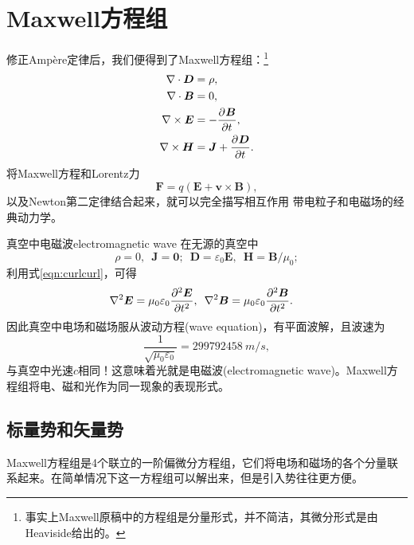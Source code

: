 \section{Maxwell方程组}
修正Ampère定律后，我们便得到了Maxwell方程组：\footnote{事实上Maxwell原稿中的方程组是分量形式，并不简洁，其微分形式是由Heaviside给出的。}
\begin{subequations}
    \begin{align}
        \label{eqn:Maxwell divD}
        \nabla\cdot\bm D&=\rho,\\
        \label{eqn:Maxwell divB}
        \nabla\cdot\bm B&=0,\\
        \label{eqn:Maxwell curlE}
        \nabla\times\bm E&=-\frac{\partial^{{}}\bm B}{\partial{t}^{{}}},\\
        \label{eqn:Maxwell curlH}
        \nabla\times\bm H&=\bm J+\frac{\partial^{{}}\bm D}{\partial{t}^{{}}}.
    \end{align}
\end{subequations}
将Maxwell方程和Lorentz力
\begin{equation}
    \label{eqn:Lorentz}
    \bm F=q(\bm E+\bm v\times\bm B),
\end{equation}
以及Newton第二定律结合起来，就可以完全描写相互作用 带电粒子和电磁场的经典动力学。
\begin{example}{真空中电磁波}{electromagnetic wave}
    在无源的真空中
    \[
        \rho=0,\enspace\bm J=\bm 0;\enspace\bm D=\varepsilon_0\bm E,\enspace\bm H=\bm B/\mu_0;
    \]
    利用式\eqref{eqn:curlcurl}，可得
    \begin{align*}
        \lapla\bm E&%
        =\mu_0\varepsilon_0\pv[2]{\bm E}t,\enspace
        \lapla\bm B%
        =\mu_0\varepsilon_0\pv[2]{\bm B}t.
    \end{align*}
    因此真空中电场和磁场服从波动方程(wave equation)，有平面波解，且波速为
    \[
        \frac1{\sqrt{\mu_0\varepsilon_0}}=\SI{299 792 458}{m/s},
    \]
    与真空中光速$c$相同！这意味着光就是电磁波(electromagnetic wave)。Maxwell方程组将电、磁和光作为同一现象的表现形式。
\end{example}
\subsection{标量势和矢量势}
Maxwell方程组是4个联立的一阶偏微分方程组，它们将电场和磁场的各个分量联系起来。在简单情况下这一方程组可以解出来，但是引入势往往更方便。

